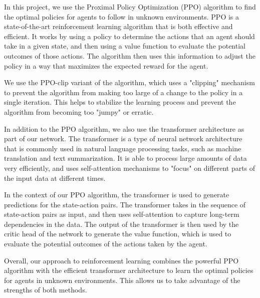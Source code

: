 \documentclass[conference]{IEEEtran}
\begin{document}
In this project, we use the Proximal Policy Optimization (PPO) algorithm \cite{schulman2017proximal} to find the optimal policies for agents to follow in unknown environments. PPO is a state-of-the-art reinforcement learning algorithm that is both effective and efficient. It works by using a policy to determine the actions that an agent should take in a given state, and then using a value function to evaluate the potential outcomes of those actions. The algorithm then uses this information to adjust the policy in a way that maximizes the expected reward for the agent.

We use the PPO-clip variant of the algorithm, which uses a "clipping" mechanism to prevent the algorithm from making too large of a change to the policy in a single iteration. This helps to stabilize the learning process and prevent the algorithm from becoming too "jumpy" or erratic.

In addition to the PPO algorithm, we also use the transformer architecture \cite{attentionisallyouneed} as part of our network. The transformer is a type of neural network architecture that is commonly used in natural language processing tasks, such as machine translation and text summarization. It is able to process large amounts of data very efficiently, and uses self-attention mechanisms to "focus" on different parts of the input data at different times.

In the context of our PPO algorithm, the transformer is used to generate predictions for the state-action pairs. The transformer takes in the sequence of state-action pairs as input, and then uses self-attention to capture long-term dependencies in the data. The output of the transformer is then used by the critic head of the network to generate the value function, which is used to evaluate the potential outcomes of the actions taken by the agent.

Overall, our approach to reinforcement learning combines the powerful PPO algorithm with the efficient transformer architecture to learn the optimal policies for agents in unknown environments. This allows us to take advantage of the strengths of both methods.

\end{document}
